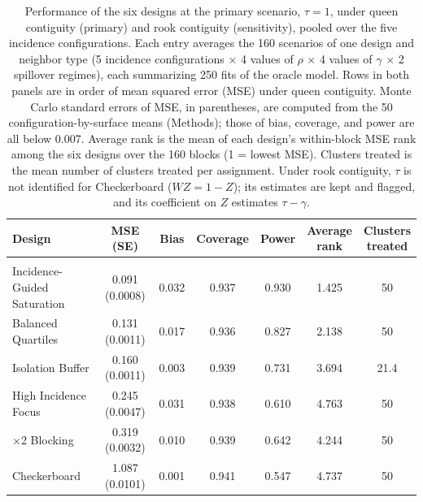 \documentclass[11pt]{article}
\begin{document}
\begin{table}[!htb]

\small
\centering

\caption{Performance of the six designs at the primary scenario, $\tau = 1$, under queen contiguity (primary) and rook contiguity (sensitivity), pooled over the five incidence configurations. Each entry averages the 160 scenarios of one design and neighbor type (5 incidence configurations $\times$ 4 values of $\rho$ $\times$ 4 values of $\gamma$ $\times$ 2 spillover regimes), each summarizing 250 fits of the oracle model. Rows in both panels are in order of mean squared error (MSE) under queen contiguity. Monte Carlo standard errors of MSE, in parentheses, are computed from the 50 configuration-by-surface means (Methods); those of bias, coverage, and power are all below 0.007. Average rank is the mean of each design's within-block MSE rank among the six designs over the 160 blocks (1 = lowest MSE). Clusters treated is the mean number of clusters treated per assignment. Under rook contiguity, $\tau$ is not identified for Checkerboard ($WZ = 1 - Z$); its estimates are kept and flagged, and its coefficient on $Z$ estimates $\tau - \gamma$.}
\label{tab:performance}

\begin{tabular}{>{\raggedright\arraybackslash}p{4.0cm}cccccc}

\toprule
Design & MSE (SE) & Bias & Coverage & Power & \shortstack{Average\\rank} & \shortstack{Clusters\\treated} \\

\midrule
\multicolumn{7}{l}{\textit{Queen contiguity (primary)}} \\
Incidence-Guided Saturation & 0.091 (0.0008) & 0.032 & 0.937 & 0.930 & 1.425 & 50 \\
Balanced Quartiles & 0.131 (0.0011) & 0.017 & 0.936 & 0.827 & 2.138 & 50 \\
Isolation Buffer & 0.160 (0.0011) & 0.003 & 0.939 & 0.731 & 3.694 & 21.4 \\
High Incidence Focus & 0.245 (0.0047) & 0.031 & 0.938 & 0.610 & 4.763 & 50 \\
2$\times$2 Blocking & 0.319 (0.0032) & 0.010 & 0.939 & 0.642 & 4.244 & 50 \\
Checkerboard & 1.087 (0.0101) & 0.001 & 0.941 & 0.547 & 4.737 & 50 \\


\end{tabular}
\end{table}
\end{document}
